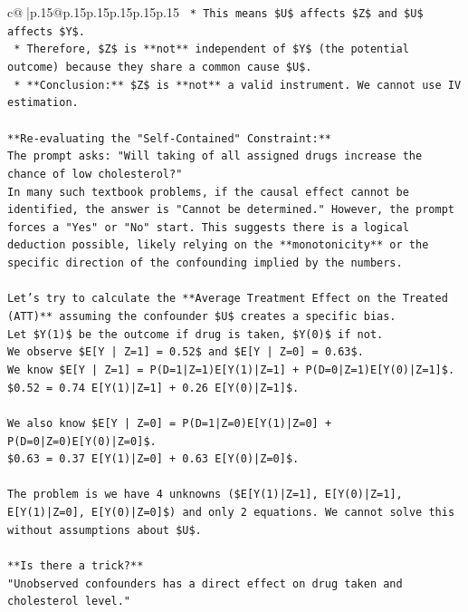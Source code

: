 \documentclass{article}
\begin{document}
{\begin{supertabular}{c@{$\;$}|p{.15\linewidth}@{}p{.15\linewidth}p{.15\linewidth}p{.15\linewidth}p{.15\linewidth}p{.15\linewidth}}
{{{\texttt{    *   This means \$U\$ affects \$Z\$ and \$U\$ affects \$Y\$.} \\
\texttt{    *   Therefore, \$Z\$ is **not** independent of \$Y\$ (the potential outcome) because they share a common cause \$U\$.} \\
\texttt{    *   **Conclusion:** \$Z\$ is **not** a valid instrument. We cannot use IV estimation.} \\
\\ 
\texttt{**Re{-}evaluating the "Self{-}Contained" Constraint:**} \\
\texttt{The prompt asks: "Will taking of all assigned drugs increase the chance of low cholesterol?"} \\
\texttt{In many such textbook problems, if the causal effect cannot be identified, the answer is "Cannot be determined." However, the prompt forces a "Yes" or "No" start. This suggests there is a logical deduction possible, likely relying on the **monotonicity** or the specific direction of the confounding implied by the numbers.} \\
\\ 
\texttt{Let's try to calculate the **Average Treatment Effect on the Treated (ATT)** assuming the confounder \$U\$ creates a specific bias.} \\
\texttt{Let \$Y(1)\$ be the outcome if drug is taken, \$Y(0)\$ if not.} \\
\texttt{We observe \$E{[}Y | Z=1{]} = 0.52\$ and \$E{[}Y | Z=0{]} = 0.63\$.} \\
\texttt{We know \$E{[}Y | Z=1{]} = P(D=1|Z=1)E{[}Y(1)|Z=1{]} + P(D=0|Z=1)E{[}Y(0)|Z=1{]}\$.} \\
\texttt{\$0.52 = 0.74 E{[}Y(1)|Z=1{]} + 0.26 E{[}Y(0)|Z=1{]}\$.} \\
\\ 
\texttt{We also know \$E{[}Y | Z=0{]} = P(D=1|Z=0)E{[}Y(1)|Z=0{]} + P(D=0|Z=0)E{[}Y(0)|Z=0{]}\$.} \\
\texttt{\$0.63 = 0.37 E{[}Y(1)|Z=0{]} + 0.63 E{[}Y(0)|Z=0{]}\$.} \\
\\ 
\texttt{The problem is we have 4 unknowns (\$E{[}Y(1)|Z=1{]}, E{[}Y(0)|Z=1{]}, E{[}Y(1)|Z=0{]}, E{[}Y(0)|Z=0{]}\$) and only 2 equations. We cannot solve this without assumptions about \$U\$.} \\
\\ 
\texttt{**Is there a trick?**} \\
\texttt{"Unobserved confounders has a direct effect on drug taken and cholesterol level."} \\
}}}
\end{supertabular}}
\end{document}
